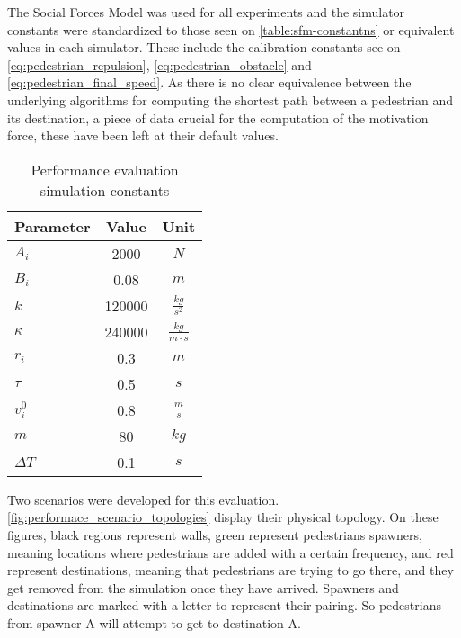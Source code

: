 \documentclass[twoside, 11pt]{article}
\begin{document}
The Social Forces Model was used for all experiments and the simulator constants were standardized to those seen on \autoref{table:sfm-constantns} or equivalent values in each simulator. These include the calibration constants see on \autoref{eq:pedestrian_repulsion}, \autoref{eq:pedestrian_obstacle} and \autoref{eq:pedestrian_final_speed}. As there is no clear equivalence between the underlying algorithms for computing the shortest path between a pedestrian and its destination, a piece of data crucial for the computation of the motivation force, these have been left at their default values.

\begin{table}[h]
  \begin{center}
    \begin{tabular}{ | l | c | c | } 
      \hline
      Parameter & Value & Unit\\ 
      \hline 
      $A_i$ & 2000 & $N$\\
      \hline
      $B_i$ & 0.08 & $m$\\
      \hline
      $k$ & 120000 & $\frac{kg}{s^2}$\\
      \hline
      $\kappa$ & 240000 & $\frac{kg}{m \cdot s}$\\
      \hline
      $r_i$ & 0.3 & $m$\\
      \hline
      $\tau$ & 0.5 & $s$\\
      \hline
      $v_i^0$ & 0.8 & $\frac{m}{s}$\\
      \hline
      $m$ & 80 & $kg$\\
      \hline
      $\Delta T$ & 0.1 & $s$\\
      \hline 
    \end{tabular}
    \caption{Performance evaluation simulation constants}
    \label{table:sfm-constantns}
  \end{center}
\end{table}

Two scenarios were developed for this evaluation. \autoref{fig:performace_scenario_topologies} display their physical topology. On these figures, black regions represent walls, green represent pedestrians spawners, meaning locations where pedestrians are added with a certain frequency, and red represent destinations, meaning that pedestrians are trying to go there, and they get removed from the simulation once they have arrived. Spawners and destinations are marked with a letter to represent their pairing. So pedestrians from spawner A will attempt to get to destination A.
\end{document}

